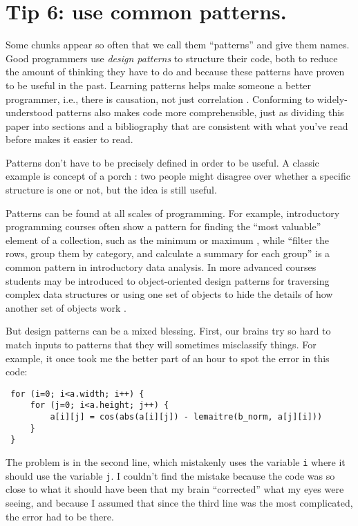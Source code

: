 \documentclass[10pt,letterpaper]{article}
\begin{document}
\section*{Tip 6: use common patterns.}

Some chunks appear so often that we call them ``patterns'' and give them names.
Good programmers use \emph{design patterns} to structure their code,
both to reduce the amount of thinking they have to do
and because these patterns have proven to be useful in the past.
Learning patterns helps make someone a better programmer,
i.e.,
there is causation, not just correlation \cite{Tichy2010}.
Conforming to widely-understood patterns also makes code more comprehensible,
just as dividing this paper into sections and a bibliography
that are consistent with what you've read before
makes it easier to read.

\begin{mdframed}
  \noindent
  Patterns don't have to be precisely defined in order to be useful.
  A classic example is concept of a porch \cite{Brand1995}:
  two people might disagree over whether a specific structure is one or not,
  but the idea is still useful.
\end{mdframed}

Patterns can be found at all scales of programming.
For example,
introductory programming courses often show a pattern for finding the ``most valuable'' element of a collection,
such as the minimum or maximum \cite{Byckling2005},
while ``filter the rows, group them by category, and calculate a summary for each group''
is a common pattern in introductory data analysis.
In more advanced courses students may be introduced to object-oriented design patterns
for traversing complex data structures
or using one set of objects to hide the details of how another set of objects work \cite{Gamma1994,Freeman2020}.

But design patterns can be a mixed blessing.
First,
our brains try so hard to match inputs to patterns that they will sometimes misclassify things.
For example,
it once took me the better part of an hour to spot the error in this code:

\begin{lstlisting}
 for (i=0; i<a.width; i++) {
     for (j=0; i<a.height; j++) {
         a[i][j] = cos(abs(a[i][j]) - lemaitre(b_norm, a[j][i]))
     }
 }
\end{lstlisting}

The problem is in the second line,
which mistakenly uses the variable \texttt{i} where it should use the variable \texttt{j}.
I couldn't find the mistake because
the code was so close to what it should have been that my brain ``corrected'' what my eyes were seeing,
and because I assumed that since the third line was the most complicated,
the error had to be there.
\end{document}
